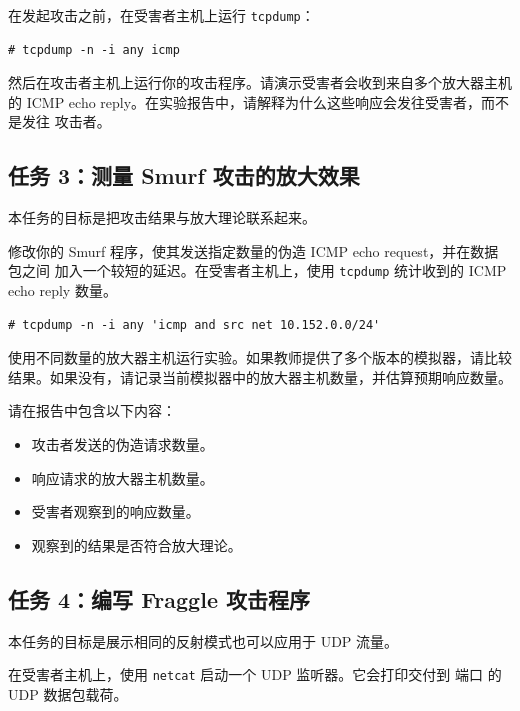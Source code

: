 在发起攻击之前，在受害者主机上运行 \texttt{tcpdump}：

\begin{lstlisting}
# tcpdump -n -i any icmp
\end{lstlisting}

然后在攻击者主机上运行你的攻击程序。请演示受害者会收到来自多个放大器主机的
ICMP echo reply。在实验报告中，请解释为什么这些响应会发往受害者，而不是发往
攻击者。



\subsection{任务 3：测量 Smurf 攻击的放大效果}

本任务的目标是把攻击结果与放大理论联系起来。

修改你的 Smurf 程序，使其发送指定数量的伪造 ICMP echo request，并在数据包之间
加入一个较短的延迟。在受害者主机上，使用 \texttt{tcpdump} 统计收到的 ICMP
echo reply 数量。

\begin{lstlisting}
# tcpdump -n -i any 'icmp and src net 10.152.0.0/24'
\end{lstlisting}

使用不同数量的放大器主机运行实验。如果教师提供了多个版本的模拟器，请比较
结果。如果没有，请记录当前模拟器中的放大器主机数量，并估算预期响应数量。

请在报告中包含以下内容：

\begin{itemize}[noitemsep]
\item 攻击者发送的伪造请求数量。
\item 响应请求的放大器主机数量。
\item 受害者观察到的响应数量。
\item 观察到的结果是否符合放大理论。
\end{itemize}



\subsection{任务 4：编写 Fraggle 攻击程序}

本任务的目标是展示相同的反射模式也可以应用于 UDP 流量。

在受害者主机上，使用 \texttt{netcat} 启动一个 UDP 监听器。它会打印交付到
端口 \fraggleport 的 UDP 数据包载荷。

